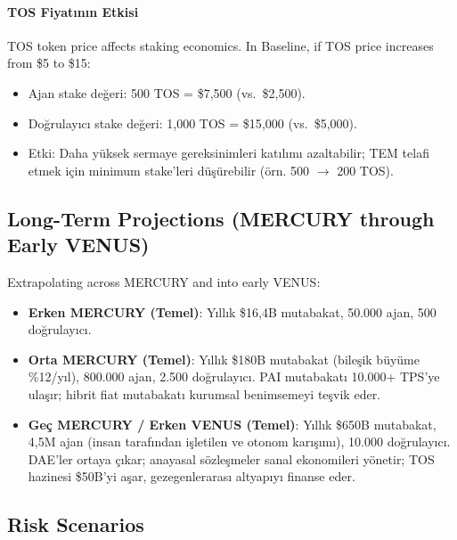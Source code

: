 \documentclass[11pt]{article}
\begin{document}
\begin{itemize}[noitemsep]
\begin{itemize}[noitemsep]
\begin{itemize}[noitemsep]
\begin{itemize}[noitemsep]
\begin{itemize}[noitemsep]
\begin{itemize}[noitemsep]
\begin{itemize}[noitemsep]
\begin{enumerate}[noitemsep]
\begin{itemize}[noitemsep]
\paragraph{TOS Fiyatının Etkisi}
TOS token price affects staking economics. In Baseline, if TOS price increases from \$5 to \$15:
\begin{itemize}[noitemsep]
  \item Ajan stake değeri: 500 TOS = \$7{,}500 (vs.\ \$2{,}500).
  \item Doğrulayıcı stake değeri: 1,000 TOS = \$15{,}000 (vs.\ \$5{,}000).
  \item Etki: Daha yüksek sermaye gereksinimleri katılımı azaltabilir; TEM telafi etmek için minimum stake'leri düşürebilir (örn. 500 $\to$ 200 TOS).
\end{itemize}

\subsection{Long-Term Projections (MERCURY through Early VENUS)}
Extrapolating across MERCURY and into early VENUS:
\begin{itemize}[noitemsep]
  \item \textbf{Erken MERCURY (Temel)}: Yıllık \$16,4B mutabakat, 50.000 ajan, 500 doğrulayıcı.
  \item \textbf{Orta MERCURY (Temel)}: Yıllık \$180B mutabakat (bileşik büyüme \%12/yıl), 800.000 ajan, 2.500 doğrulayıcı. PAI mutabakatı 10.000+ TPS'ye ulaşır; hibrit fiat mutabakatı kurumsal benimsemeyi teşvik eder.
  \item \textbf{Geç MERCURY / Erken VENUS (Temel)}: Yıllık \$650B mutabakat, 4,5M ajan (insan tarafından işletilen ve otonom karışımı), 10.000 doğrulayıcı. DAE'ler ortaya çıkar; anayasal sözleşmeler sanal ekonomileri yönetir; TOS hazinesi \$50B'yi aşar, gezegenlerarası altyapıyı finanse eder.
\end{itemize}

\subsection{Risk Scenarios}

\end{itemize}
\end{enumerate}
\end{itemize}
\end{itemize}
\end{itemize}
\end{itemize}
\end{itemize}
\end{itemize}
\end{itemize}
\end{document}
